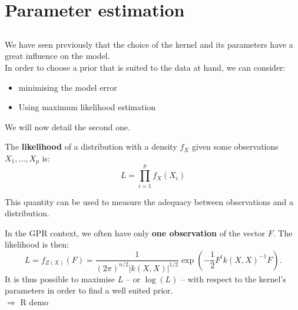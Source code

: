 \documentclass{beamer}
\begin{document}
\section[Param. estim.]{Parameter estimation}
\subsection{}

\begin{frame}{}
We have seen previously that the choice of the kernel and its parameters have a great influence on the model. \\ \vspace{5mm}
In order to choose a prior that is suited to the data at hand, we can consider:
\begin{itemize}
	\item minimising the model error
	\item Using maximum likelihood estimation
\end{itemize}
We will now detail the second one.
\end{frame}

\begin{frame}{}
\begin{definition}
The \textbf{likelihood} of a distribution with a density $f_X$ given some observations $X_1, \dots,X_p$ is:
\begin{equation*}
 	L = \prod_{i=1}^p f_X(X_i)
\end{equation*}
\end{definition}
This quantity can be used to measure the adequacy between observations and a distribution.\\ \vspace{3mm}
\end{frame}

\begin{frame}{}
In the GPR context, we often have only \textbf{one observation} of the vector $F$. The likelihood is then:
\begin{equation*}
 	L = f_{Z(X)}(F) = \frac{1}{\displaystyle (2 \pi)^{n/2} |k(X,X)|^{1/2}} \exp \left(-\frac12 F^t k(X,X)^{-1} F  \right).
\end{equation*}
It is thus possible to maximise $L$ -- or $\log(L)$ -- with respect to the kernel's parameters in order to find a well suited prior.\\
\vspace{5mm}
\alert{$\Rightarrow$ R demo}
\end{frame}
\end{document}
